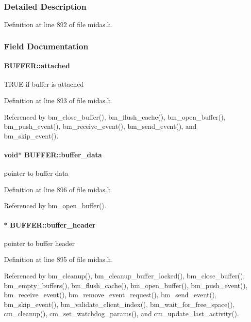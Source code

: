 \subsubsection{Detailed Description}


Definition at line 892 of file midas.h.

\subsubsection{Field Documentation}
\paragraph[{attached}]{ {\bf BUFFER::attached}}\hfill\label{structBUFFER_a495ba8d2558dac6d40a46564c5067a2c}
TRUE if buffer is attached 

Definition at line 893 of file midas.h.

Referenced by bm\_\-close\_\-buffer(), bm\_\-flush\_\-cache(), bm\_\-open\_\-buffer(), bm\_\-push\_\-event(), bm\_\-receive\_\-event(), bm\_\-send\_\-event(), and bm\_\-skip\_\-event().
\paragraph[{buffer\_\-data}]{\setlength{\rightskip}{0pt plus 5cm}void$\ast$ {\bf BUFFER::buffer\_\-data}}\hfill\label{structBUFFER_a8a66c13998d446c0a1bad0b5d4a2d248}
pointer to buffer data 

Definition at line 896 of file midas.h.

Referenced by bm\_\-open\_\-buffer().
\paragraph[{buffer\_\-header}]{$\ast$ {\bf BUFFER::buffer\_\-header}}\hfill\label{structBUFFER_a9df49f2ae2aae272c18d34e4cc5a5e94}
pointer to buffer header 

Definition at line 895 of file midas.h.

Referenced by bm\_\-cleanup(), bm\_\-cleanup\_\-buffer\_\-locked(), bm\_\-close\_\-buffer(), bm\_\-empty\_\-buffers(), bm\_\-flush\_\-cache(), bm\_\-open\_\-buffer(), bm\_\-push\_\-event(), bm\_\-receive\_\-event(), bm\_\-remove\_\-event\_\-request(), bm\_\-send\_\-event(), bm\_\-skip\_\-event(), bm\_\-validate\_\-client\_\-index(), bm\_\-wait\_\-for\_\-free\_\-space(), cm\_\-cleanup(), cm\_\-set\_\-watchdog\_\-params(), and cm\_\-update\_\-last\_\-activity().
